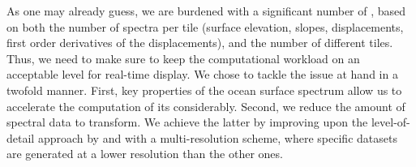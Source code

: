 As one may already guess, we are burdened with a significant number of
\FourierTransforms, based on both the number of spectra per tile (surface elevation,
slopes, displacements, first order derivatives of the displacements),
and the number of different tiles.
Thus, we need to make sure to keep the computational workload on an acceptable
level for real-time display. We chose to tackle the issue at hand in a
twofold manner.
First, key properties of the ocean surface spectrum allow us to accelerate the
computation of its \InvFourierTransform considerably.
Second, we reduce the amount of spectral data to transform. We achieve the
latter by improving upon the level-of-detail approach by \citet{misc:oceanlightingfft}
and \citet{article:whitecaps} with a multi-resolution scheme,
where specific
datasets are generated at a lower resolution than the other ones.




